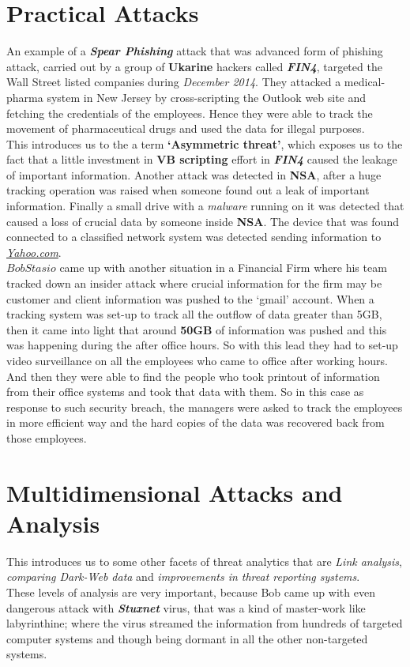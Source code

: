 \documentclass{article}
\begin{document}
\section*{Practical Attacks}

An example of a \textbf{\textit{Spear Phishing}} attack that was advanced form of phishing attack, carried out by a group of \textbf{Ukarine} hackers called \textit{\textbf{FIN4}},  targeted the Wall Street listed companies during \textit{December 2014}. They attacked a  medical-pharma system in New Jersey by cross-scripting the Outlook web site and fetching the credentials of the employees. Hence they were able to track the movement of pharmaceutical drugs and used the data for illegal purposes.\\

This introduces us to the a term \textbf{`Asymmetric threat’}, which exposes us to the fact that a little investment in \textbf{VB scripting} effort in \textit{\textbf{FIN4}} caused the leakage of important information. Another attack was detected in \textbf{NSA}, after a huge tracking operation was raised when someone found out a leak of important information. Finally a small drive with a \textit{malware} running on it was detected that caused a loss of crucial data by someone inside \textbf{NSA}. The device that was found connected to a classified network system was detected sending information to \underline{\textit{Yahoo.com}}.\\

$Bob Stasio$ came up with another situation in a Financial Firm where his team tracked down an insider attack where crucial information for the firm may be customer and client information was pushed to the `gmail' account. When a tracking system was set-up to track all the outflow of data greater than 5GB, then it came into light that around \textbf{50GB} of information was pushed and this was happening during the after office hours. So with this lead they had to set-up video surveillance on all the employees who came to office after working hours. And then they were able to find the people who took printout of information from their office systems and took that data with them. So in this case as response to such security breach, the managers were asked to track the employees in more efficient way and the hard copies of the data was recovered back from those employees.\\

\section*{Multidimensional Attacks and Analysis}
This introduces us to some other facets of threat analytics that are \textit{Link analysis}, \textit{comparing Dark-Web data} and \textit{improvements in threat reporting systems}.\\
These levels of analysis are very important, because Bob came up with even dangerous attack with \textbf{\textit{Stuxnet}} virus, that was a kind of master-work like labyrinthine; where the virus streamed the information from hundreds of targeted computer systems and though being dormant in all the other non-targeted systems.\\
\end{document}
